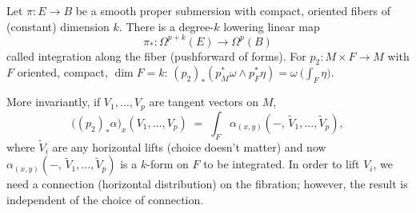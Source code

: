 \documentclass[12pt]{article}
\begin{document}
\begin{remark} Let $\pi:E\to B$ be a smooth proper submersion with compact, oriented fibers of (constant) dimension $k$. There is a degree-$k$ lowering linear map
    \[\pi_*:\Omega^{p+k}(E)\longrightarrow \Omega^{p}(B)\]  
called integration along the fiber (pushforward of forms). For $p_2:M\times F\to M$ with $F$ oriented, compact, $\dim F=k$:
    $(p_2)_*(p_M^*\omega\wedge p_F^*\eta) = \omega\ \Big(\int_F \eta\Big)$.

    More invariantly, if $V_1,\dots,V_p$ are tangent vectors on $M$,
    \[
        \big((p_2)_*\alpha\big)_x(V_1,\dots,V_p)
        \;=\;\int_{F}\alpha_{(x,y)}(-,\,\tilde V_1,\dots,\tilde V_p),
    \]
    where $\tilde V_i$ are any horizontal lifts (choice doesn't matter) and now $\alpha_{(x,y)}(-,\,\tilde V_1,\dots,\tilde V_p)$ is a $k$-form on $F$ to be integrated. In order to lift $V_i$, we need a connection (horizontal distribution) on the fibration; however, the result is independent of the choice of connection.


\end{remark}
\end{document}
